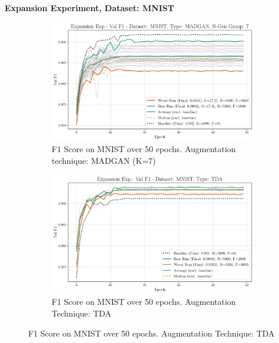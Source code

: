 \newpage
\noindent\textbf{Expansion Experiment, Dataset: MNIST}
\begin{figure}[H]
	\centering
	\begin{subfigure}{.85\textwidth}
		\includegraphics[width=\textwidth]{abb/strat_classifier_performance/MNIST_STRATIFIED_CLASSIFIERS_MADGAN_NEW/expansion_experiments/val_f1_score_MADGAN_MNIST_n_gen_7_all.png}
		\caption{F1 Score on MNIST over 50 epochs. Augmentation technique: MADGAN (K=7)}
        \label{fig:res_expansion_mnist_tda_vs_madgan__madgan}
	\end{subfigure}
	\begin{subfigure}{.85\textwidth}
		\includegraphics[width=\textwidth]{abb/strat_classifier_performance/tda_mnist/expansion_experiments/val_f1_score_tda_mnist_mnist_all.png}
		\caption{F1 Score on MNIST over 50 epochs. Augmentation Technique: TDA}
        \label{fig:res_expansion_mnist_tda_vs_madgan__tda}
	\end{subfigure}
\end{figure}

